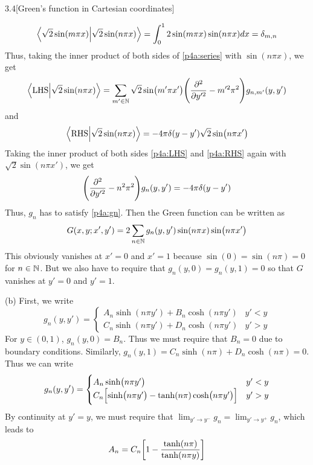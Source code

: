 \documentclass[12pt]{article}
\begin{document}
\begin{problem}{3.4}[Green's function in Cartesian coordinates]
\begin{solution}
\begin{align}
        \braket{\sqrt2\sin(m\pi x)}{\sqrt2\sin(n\pi x)}
        =\int_0^12\sin(m\pi x)\sin(n\pi x)dx
        =\delta_{m,n}
    \end{align} 
    Thus, taking the inner product of both sides of \eqref{p4a:series} with
    $\sin(n\pi x)$, we get
    \begin{equation}\label{p4a:LHS}
        \braket{\text{LHS}}{\sqrt2\sin(n\pi x)}
        =\sum_{m'\in\mathbb{N}}\sqrt2\sin(m'\pi x')\qty(\frac{\partial^2}{\partial
    y'^2}-m'^2\pi^2)g_{n,m'}(y,y')
    \end{equation}
    and
    \begin{equation}\label{p4a:RHS}
        \braket{\text{RHS}}{\sqrt2\sin(n \pi x)}=-4\pi\delta(y-y')\sqrt2\sin(n \pi x')
    \end{equation}
    Taking the inner product of both sides \eqref{p4a:LHS} and \eqref{p4a:RHS}
    again with $\sqrt2\sin(n\pi x')$, we get
    \begin{equation}\label{p4a:gn}
        \qty(\frac{\partial^2}{\partial
        y'^2}-n^2\pi^2)g_n(y,y')=-4\pi\delta(y-y') 
    \end{equation}
    Thus, $g_n$ has to satisfy \eqref{p4a:gn}. Then the Green function can be
    written as
    \begin{equation}\label{p4a:G}
        G(x,y;x',y')=2\sum_{n\in\mathbb{N}}g_n(y,y')\sin(n\pi x)\sin(n\pi x') 
    \end{equation}
    This obviously vanishes at $x'=0$ and $x'=1$ because $\sin(0)=\sin(n\pi)=0$ 
    for $n\in\mathbb{N}$. But we also have to require that $g_n(y,0)=g_n(y,1)=0$ so that
    $G$ vanishes at $y'=0$ and $y'=1$.

    (b) First, we write
    \begin{equation}
        g_n(y,y')=\begin{cases}
            A_n\sinh(n\pi y')+B_n\cosh(n\pi y') & y'<y\\   
            C_n\sinh(n\pi y')+D_n\cosh(n\pi y') & y'>y
        \end{cases}
    \end{equation}
    For $y\in(0,1)$, $g_n(y,0)=B_n$. Thus we must require that $B_n=0$ due to
    boundary conditions. Similarly, $g_n(y,1)=C_n\sinh(n\pi)+D_n\cosh(n\pi)=0$. Thus
    we can write
    \begin{equation}\label{p4b:gn}
         g_n(y,y')=\begin{cases}
            A_n\sinh(n\pi y')& y'<y\\   
            C_n\qty[\sinh(n\pi y')-\tanh(n\pi)\cosh(n\pi y')] & y'>y
        \end{cases}       
    \end{equation}
    By continuity at $y'=y$, we must require that $\lim_{y'\to
    y^-}g_n=\lim_{y'\to y^+}g_n$, which leads to
    \begin{equation}\label{p4b:A}
        A_n=C_n\qty[1-\frac{\tanh(n\pi)}{\tanh(n\pi y)}] 
    \end{equation}


\end{solution}
\end{problem}
\end{document}
